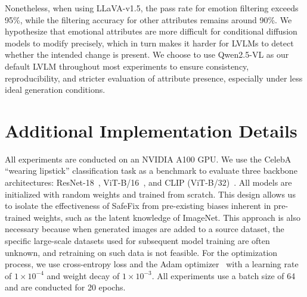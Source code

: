 \documentclass[10pt]{article} %
\newcommand{\qwen}{Qwen2.5-VL\xspace}
\newcommand{\llava}{LLaVA-v1.5\xspace}
\begin{document}
Nonetheless, when using \llava, the pass rate for emotion filtering exceeds 95\%, while the filtering accuracy for other attributes remains around 90\%. We hypothesize that emotional attributes are more difficult for conditional diffusion models to modify precisely, which in turn makes it harder for LVLMs to detect whether the intended change is present. We choose to use \qwen as our default LVLM throughout most experiments to ensure consistency, reproducibility, and stricter evaluation of attribute presence, especially under less ideal generation conditions.



\section{Additional Implementation Details} 
All experiments are conducted on an NVIDIA A100 GPU. We use the CelebA ``wearing lipstick'' classification task as a benchmark to evaluate three backbone architectures: ResNet-18~\citep{he2016deep}, ViT-B/16~\citep{dosovitskiy2020vit}, and CLIP (ViT-B/32)~\citep{radford2021learning}. All models are initialized with random weights and trained from scratch. This design allows us to isolate the effectiveness of SafeFix from pre-existing biases inherent in pre-trained weights, such as the latent knowledge of ImageNet. This approach is also necessary because when generated images are added to a source dataset, the specific large-scale datasets used for subsequent model training are often unknown, and retraining on such data is not feasible. For the optimization process, we use cross-entropy loss and the Adam optimizer~\citep{kingma2015adam} with a learning rate of $1\times10^{-4}$ and weight decay of $1\times10^{-3}$. All experiments use a batch size of 64 and are conducted for 20 epochs.
\end{document}
